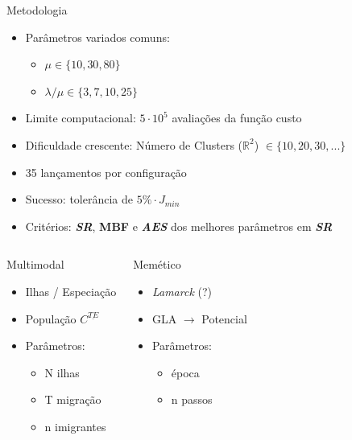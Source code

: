 \documentclass[pdf]{beamer}
\begin{document}
\begin{frame}{Metodologia}
			\begin{itemize}
				\item Parâmetros variados comuns:
				\begin{itemize}
					\item $ \mu \in \{10, 30, 80\} $ 
					\item $ \lambda/\mu \in \{3, 7, 10, 25\} $
				\end{itemize}
				
				\item Limite computacional: $ 5\cdot 10^5 $ avaliações da função custo
				\item Dificuldade crescente: Número de Clusters ($ \mathbb{R}^2 $) $ \in \{10, 20, 30, ... \} $
				\item 35 lançamentos por configuração
				\item Sucesso: tolerância de $5\% \cdot J_{min} $
				\item Critérios: \textit{\textbf{SR}}, \textbf{MBF} e \textit{\textbf{AES}} dos melhores parâmetros em \textit{\textbf{SR}} 

			\end{itemize}
	\begin{columns}
			\begin{block}{Multimodal}
			\begin{itemize}
				\item Ilhas / Especiação
				\item População $ C^{\underline{TE}}  $
				\item Parâmetros: 
				\begin{itemize}
					\item N ilhas
					\item T migração
					\item n imigrantes
				\end{itemize}
			\end{itemize}
			\end{block}
		
		\begin{block}{Memético}
			\begin{itemize}
				\item \textit{Lamarck} (?)
				\item GLA $ \rightarrow $ Potencial
				\item Parâmetros:
				\begin{itemize}
					\item época
					\item n passos
				\end{itemize}
			\end{itemize}
			

\end{block}
\end{columns}
\end{frame}
\end{document}
